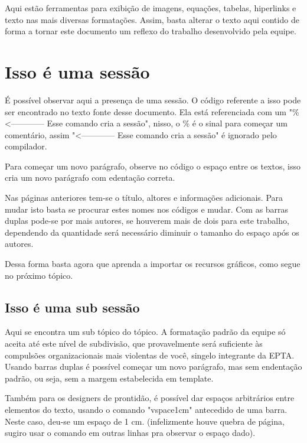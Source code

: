 Aqui estão ferramentas para exibição de imagens, equações, tabelas, hiperlinks e texto nas mais diversas formatações. Assim, basta alterar o texto aqui contido de forma a tornar este documento um reflexo do trabalho desenvolvido pela equipe.

\section{Isso é uma sessão} %
É possível observar aqui a presença de uma sessão. O código referente a isso pode ser encontrado no texto fonte desse documento. Ela está referenciada com um "\%  <------------  Esse comando cria a sessão", nisso, o \% é o sinal para começar um comentário, assim "<------------  Esse comando cria a sessão" é ignorado pelo compilador.

Para começar um novo parágrafo, observe no código o espaço entre os textos, isso cria um novo parágrafo com edentação correta.

Nas páginas anteriores tem-se o título, altores e informações adicionais. Para mudar isto basta se procurar estes nomes nos códigos e mudar. Com as barras duplas pode-se por mais autores, se houverem mais de dois para este trabalho, dependendo da quantidade será necessário diminuir o tamanho do espaço após os autores.

Dessa forma basta agora que aprenda a importar os recursos gráficos, como segue no próximo tópico.

\subsection{Isso é uma sub sessão} %

Aqui se encontra um sub tópico do tópico. A formatação padrão da equipe só aceita até este nível de subdivisão, que provavelmente será suficiente às compulsões organizacionais mais violentas de você, singelo integrante da EPTA. \\
Usando barras duplas é possível começar um novo parágrafo, mas sem endentação padrão, ou seja, sem a margem estabelecida em template.  

Também para os designers de prontidão, é possível dar espaços arbitrários entre elementos do texto, usando o comando "vspace{1cm}" antecedido de uma barra. Neste caso, deu-se um espaço de 1 cm. (infelizmente houve quebra de página, sugiro usar o comando em outras linhas pra observar o espaço dado).

